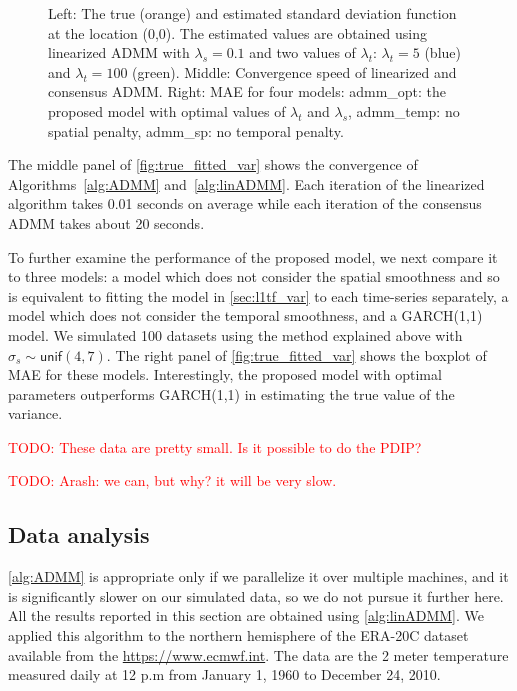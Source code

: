 \documentclass{article}
\newcommand{\attn}[1]{\textcolor{red}{TODO: #1}}
\begin{document}
\begin{figure}[tb]
  \caption{Left: The true (orange) and estimated standard deviation 
    function at the location (0,0). The estimated values are
    obtained using linearized ADMM with $\lambda_s=0.1$ and two
    values of $\lambda_t$: $\lambda_t=5$ (blue) and
    $\lambda_t=100$ (green). Middle: Convergence speed of linearized and consensus ADMM. Right: MAE for four models: admm\_opt: the proposed model with optimal values of $\lambda_t$ and $\lambda_s$, admm\_temp: no spatial penalty, admm\_sp: no temporal penalty.} \label{fig:true_fitted_var}
\end{figure}

The middle panel of \autoref{fig:true_fitted_var} shows the convergence of Algorithms~\ref{alg:ADMM} and~\ref{alg:linADMM}. Each iteration of the linearized algorithm takes 0.01 seconds on average while each iteration of the consensus ADMM takes about 20 seconds.

To further examine the performance of the proposed model, we next compare it to three models: a model which does not consider the spatial smoothness and so is equivalent to fitting the model in \autoref{sec:l1tf_var} to each time-series separately, a model which does not consider the temporal smoothness, and a GARCH(1,1) model. We simulated 100 datasets using the method explained above with $\sigma_s \sim \mathsf{unif}(4,7)$. The right panel of \autoref{fig:true_fitted_var} shows the boxplot of MAE for these models. Interestingly, the proposed model with optimal parameters outperforms GARCH(1,1) in estimating the true value of the variance.   



\attn{These data are pretty small. Is it possible to do the PDIP?}

\attn{Arash: we can, but why? it will be very slow.}


\subsection{Data analysis}

\autoref{alg:ADMM} is appropriate only if
we parallelize it over multiple machines, and it is significantly
slower on our simulated data, so we do not pursue it
further here. All the results reported in this section are obtained
using \autoref{alg:linADMM}. We
applied this algorithm to the northern hemisphere of the ERA-20C
dataset available from the \href{European Center for Medium-Range
  Weather Forecasts}{https://www.ecmwf.int}. The data are
the 2 meter temperature measured daily at 12 p.m from January 1, 1960
to December 24, 2010. 
\end{document}
